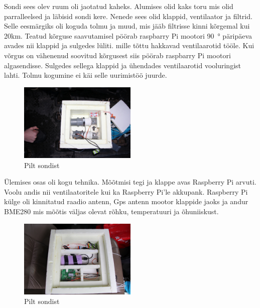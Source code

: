 \documentclass{trkut}%
\begin{document}
Sondi sees olev ruum oli jaotatud kaheks. Alumises olid kaks toru mis olid parralleelsed ja läbisid sondi kere. Nenede sees olid klappid, ventilaator ja filtrid. Selle eesmärgiks oli koguda tolmu ja muud, mis jääb filtrisse kinni kõrgemal kui 20km. Teatud kõrguse saavutamisel pöörab raspbarry Pi mootori \SI{90}{\degree} päripäeva avades nii klappid ja sulgedes lüliti. mille tõttu hakkavad ventilaarotid tööle. Kui võrgus on vähenenud soovitud kõrgusest siis pöörab raspbarry Pi mootori algasendisse. Sulgedes sellega klappid ja ühendades ventilaarotid vooluringist lahti. Tolmu kogumine ei käi selle uurimistöö juurde.

\begin{figure}[h]
	\includegraphics[width=0.5\textwidth]{PicGra/sond2korrus.jpg}
	\caption{Pilt sondist}
	\label{sond}%
\end{figure}

Ülemises osas oli kogu tehnika. Mõõtmisi tegi ja klappe avas Raspberry Pi arvuti. Voolu andis nii ventilaatoritele kui ka Raspberry Pi'le akkupank. Raspberry Pi külge oli kinnitatud raadio antenn, Gps antenn mootor klappide jaoks ja andur BME280 mis mõõtis väljas olevat rõhku, temperatuuri ja õhuniiskust.

\begin{figure}[h]
	\includegraphics[width=0.5\textwidth]{PicGra/sond1korrus1.jpg}
	\caption{Pilt sondist}
	\label{sond}%
\end{figure}
\end{document}
